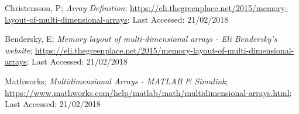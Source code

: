 \documentclass[10pt, conference]{IEEEtran}
\begin{document}
\begin{thebibliography}{}

Christensson, P; \emph{Array Definition}; \url{https://eli.thegreenplace.net/2015/memory-layout-of-multi-dimensional-arrays}; Last Accessed: 21/02/2018

Bendersky, E; \emph{Memory layout of multi-dimensional arrays - Eli Bendersky's website}; \url{https://eli.thegreenplace.net/2015/memory-layout-of-multi-dimensional-arrays}; Last Accessed: 21/02/2018

Mathworks; \emph{Multidimensional Arrays - MATLAB \& Simulink}; \url{https://www.mathworks.com/help/matlab/math/multidimensional-arrays.html}; Last Accessed: 21/02/2018

\end{thebibliography}
\end{document}
